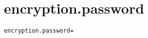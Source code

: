 \section{encryption.password}
\label{configuration:EncryptionPassword}
\ClearAPI
\TODO
\begin{lstlisting}[style=Props,caption={Usage example for \textit{encryption.password}}]
encryption.password=
\end{lstlisting}